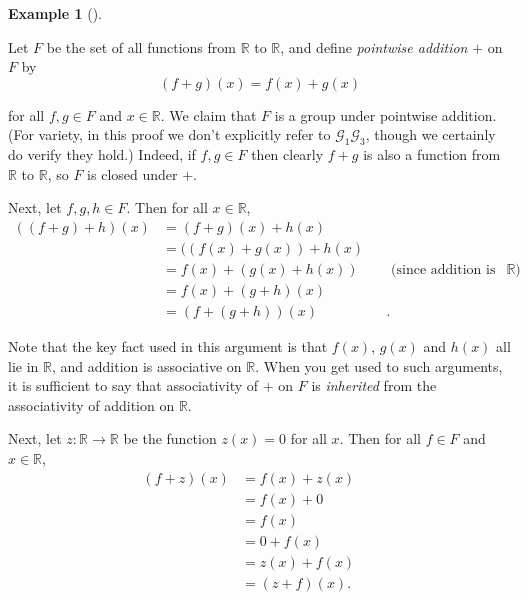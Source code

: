 \documentclass[10pt,]{book}
\theoremstyle{plain}
\theoremstyle{definition}
\theoremstyle{definition}
\theoremstyle{definition}
\newtheorem{example}[theorem]{Example}
\theoremstyle{definition}
\numberwithin{equation}{section}
\def\R{\mathbb{R}}
\def\G{\mathcal{G}}
\newcommand{\amp}{ & }
\begin{document}
\begin{example}[]\label{example-21}

        Let \(F\) be the set of all functions from \(\R\) to \(\R\), and define \emph{pointwise addition} \(+\) on \(F\) by
\begin{equation*}

          (f+g)(x)=f(x)+g(x)
        
\end{equation*}

        for all \(f,g\in F\) and \(x\in \R\). We claim that \(F\) is a group under pointwise
        addition. (For variety, in this proof we don't explicitly refer
        to \(\G_1\)\textendash{}\(\G_3\), though we certainly do verify they hold.)
        Indeed, if \(f,g\in F\) then clearly \(f+g\) is also a function
        from \(\R\) to \(\R\), so \(F\) is closed under \(+\).
\par

        Next, let \(f,g,h\in F\). Then for all \(x\in \R\),
\begin{align*}
((f+g)+h)(x)\amp =(f+g)(x)+h(x)\amp \amp\\
\amp =((f(x)+g(x))+h(x)\amp \amp\\
\amp =f(x)+(g(x)+h(x))\amp \amp \text{ (since addition is associative on
          \(\R\)) }\\
\amp =f(x)+(g+h)(x)\amp \amp\\
\amp =(f+(g+h))(x)\amp \amp .
\end{align*}

\par

        Note
        that the key fact used in this argument is that \(f(x)\), \(g(x)\) and
        \(h(x)\) all lie in \(\R\), and addition is associative on \(\R\).
        When you get used to such arguments, it is sufficient to say that
        associativity of \(+\) on \(F\) is \emph{inherited} from the
        associativity of addition on \(\R\).
\par

        Next, let \(z:\R\to\R\) be the function \(z(x)=0\) for all \(x\). Then for all \(f\in F\) and \(x\in \R\),
\begin{align*}
(f+z)(x)\amp =f(x)+z(x)\amp \amp\\
\amp =f(x)+0\amp \amp\\
\amp =f(x)\amp \amp \\
\amp =0+f(x)\amp \amp\\
\amp =z(x)+f(x)\amp \amp\\
\amp = (z+f)(x).
\end{align*}


\end{example}
\end{document}
